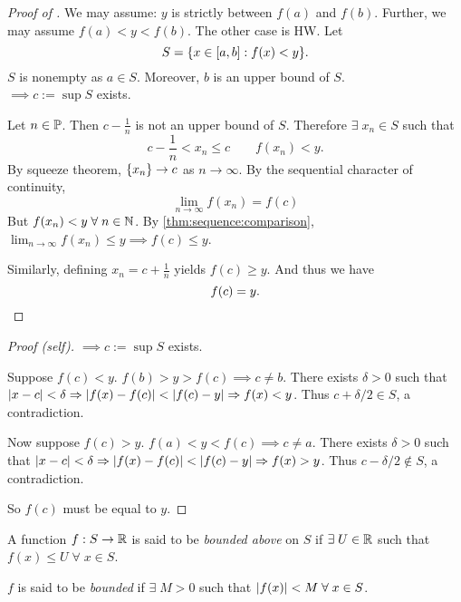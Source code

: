 
\begin{proof}[Proof of ]
    We may assume: $y$ is strictly between $f(a)$ and $f(b)$.
    Further, we may assume $f(a) < y < f(b)$.
    The other case is \textcolor{exercise}{HW}.
    Let \[
        S = \set{x \in [a, b]: f(x) < y}.
    \] $S$ is nonempty as $a \in S$.
    Moreover, $b$ is an upper bound of $S$. \\
    $\implies c := \sup S$ exists. 

    Let $n \in \P$.
    Then $c - \frac{1}{n}$ is not an upper bound of $S$.
    Therefore $\exists\; x_{n} \in S$ such that \[
        c - \frac{1}{n} < x_{n} \leq c \qquad f(x_{n}) < y.
    \] By squeeze theorem, $\set{x_{n}} \to c$ as $n \to \infty$.
    By the sequential character of continuity, \[
        \lim_{n \to \infty} f(x_{n}) = f(c)
    \] But $f(x_{n}) < y \;\forall\; n \in \N$.
    By \cref{thm:sequence:comparison}, $\lim_{n \to \infty} f(x_{n}) \leq y \implies f(c) \leq y$.

    Similarly, defining $x_{n} = c + \frac{1}{n}$ yields $f(c) \geq y$. And thus we have \[
        f(c) = y. \qedhere
    \]
\end{proof}

\begin{proof}[Proof \textcolor{self_proof}{(self)}]
    $\implies c := \sup S$ exists.

    Suppose $f(c) < y$.
    $f(b) > y > f(c) \implies c \neq b$.
    There exists $\delta > 0$ such that $\abs{x - c} < \delta \implies \abs{f(x) - f(c)} < \abs{f(c) - y} \implies f(x) < y$.
    Thus $c + \delta/2 \in S$, a contradiction.

    Now suppose $f(c) > y$.
    $f(a) < y < f(c) \implies c \neq a$.
    There exists $\delta > 0$ such that $\abs{x - c} < \delta \implies \abs{f(x) - f(c)} < \abs{f(c) - y} \implies f(x) > y$.
    Thus $c - \delta/2 \not\in S$, a contradiction.

    So $f(c)$ must be equal to $y$.
\end{proof}

\begin{defn} \label{defn:cont:bounded}
    A function $f : S \to \R$ is said to be \emph{bounded above} on $S$ if $\exists\; U \in \R$ such that $f(x) \leq U \;\forall\; x \in S$.

    $f$ is said to be \emph{bounded} if $\exists\; M > 0$ such that $\abs{f(x)} < M \;\forall\; x \in S$.
\end{defn}

